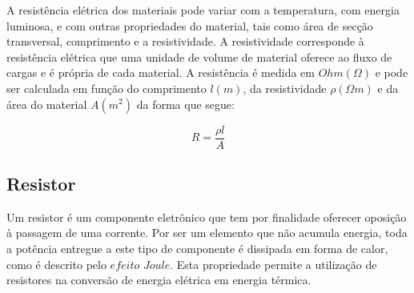 \documentclass[12pt,fleqn]{book} %
\begin{document}
	          A resistência elétrica dos materiais pode variar com a temperatura, com energia luminosa, e com outras propriedades do material, tais como área de secção transversal, comprimento e a resistividade. A resistividade corresponde à resistência elétrica que uma unidade de volume de material oferece ao fluxo de cargas e é própria de cada material. A resistência é medida em $Ohm (\Omega)$ e pode ser calculada em função do comprimento $l (m)$, da resistividade $\rho (\Omega m)$ e da área do material $A (m^2)$ da forma que segue:
	         
	                 \begin{equation}\label{oms2}
	                 R = \frac{\rho l}{A}
	                 \end{equation}
	            
	        \subsection{Resistor}
	      Um resistor é um componente eletrônico que tem por finalidade oferecer oposição à passagem de uma corrente. Por ser um elemento que não acumula energia, toda a potência entregue a este tipo de componente é dissipada em forma de calor, como é descrito pelo $efeito$ $Joule$. Esta propriedade permite a utilização de resistores na conversão de energia elétrica em energia térmica.
	        
\end{document}
